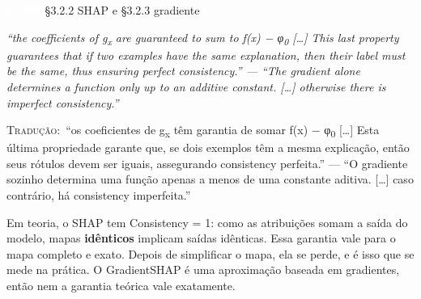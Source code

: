 \documentclass[11pt,a4paper]{article}
\newcommand{\metrictag}[2]{{\setlength{\fboxsep}{1.5pt}%
  \ifstrequal{#1}{c}{\colorbox{cC}{\textcolor{white}{\scriptsize\textbf{#2}}}}{%
  \ifstrequal{#1}{s}{\colorbox{cS}{\textcolor{white}{\scriptsize\textbf{#2}}}}{%
  \colorbox{black!60}{\textcolor{white}{\scriptsize\textbf{#2}}}}}}}
\newcommand{\pagechip}[1]{{\setlength{\fboxsep}{1.5pt}\colorbox{cAcc}{\textcolor{white}{\scriptsize\texttt{#1}}}}}
\newenvironment{origquote}{\par\itshape\small}{\par}
\newenvironment{tradquote}{\par\small\textsc{Tradução:}\ }{\par}
\newcommand{\explab}[1]{\par\smallskip{\small\color{cAcc}\textbf{\MakeUppercase{#1}}}\par}
\begin{document}
\begin{citacard}{\pagechip{p. 8–9} §3.2.2 SHAP e §3.2.3 gradiente \metrictag{c}{C}}
\begin{origquote}“the coefficients of g\textsubscript{x} are guaranteed to sum to f(x) − φ\textsubscript{0} […] This last property guarantees that if two examples have the same explanation, then their label must be the same, thus ensuring perfect consistency.” — “The gradient alone determines a function only up to an additive constant. […] otherwise there is imperfect consistency.”\end{origquote}
\begin{tradquote}“os coeficientes de g\textsubscript{x} têm garantia de somar f(x) − φ\textsubscript{0} […] Esta última propriedade garante que, se dois exemplos têm a mesma explicação, então seus rótulos devem ser iguais, assegurando consistency perfeita.” — “O gradiente sozinho determina uma função apenas a menos de uma constante aditiva. […] caso contrário, há consistency imperfeita.”\end{tradquote}
\explab{Explicação}
Em teoria, o SHAP tem Consistency = 1: como as atribuições somam a saída do modelo, mapas \textbf{idênticos} implicam saídas idênticas. Essa garantia vale para o mapa completo e exato. Depois de simplificar o mapa, ela se perde, e é isso que se mede na prática. O GradientSHAP é uma aproximação baseada em gradientes, então nem a garantia teórica vale exatamente.
\end{citacard}
\end{document}
